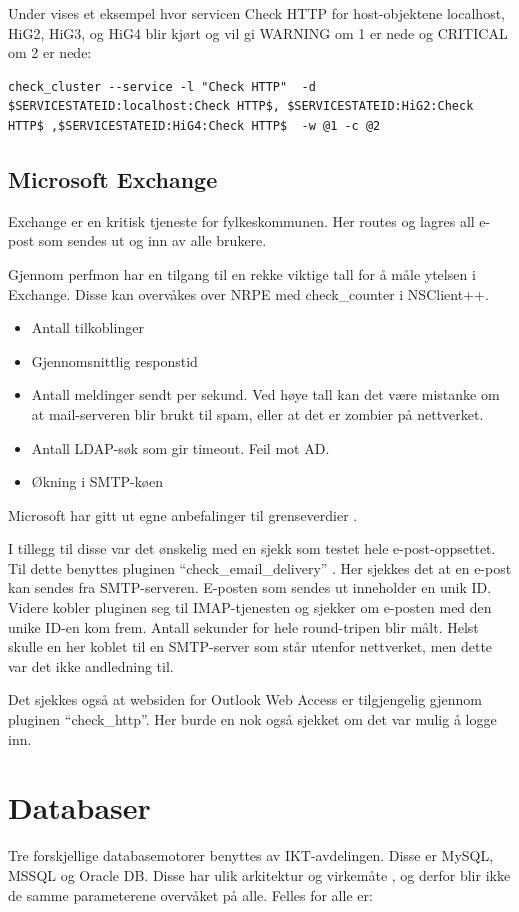 Under vises et eksempel hvor servicen Check HTTP for host-objektene localhost, HiG2, HiG3, og HiG4 blir kjørt og vil gi WARNING om 1 er nede og CRITICAL om 2 er nede: 
\begin{lstlisting}
check_cluster --service -l "Check HTTP"  -d $SERVICESTATEID:localhost:Check HTTP$, $SERVICESTATEID:HiG2:Check HTTP$ ,$SERVICESTATEID:HiG4:Check HTTP$  -w @1 -c @2
\end{lstlisting}

\subsection{Microsoft Exchange}

Exchange er en kritisk tjeneste for fylkeskommunen. Her routes og lagres all e-post som sendes ut og inn av alle brukere. 

Gjennom perfmon har en tilgang til en rekke viktige tall \cite{exchange} for å måle ytelsen i Exchange. Disse kan overvåkes over NRPE med check\_counter i NSClient++.
\begin{itemize}
	\item Antall tilkoblinger
	\item Gjennomsnittlig responstid
	\item Antall meldinger sendt per sekund. Ved høye tall kan det være mistanke om at mail-serveren blir brukt til spam, eller at det er zombier på nettverket.
	\item Antall LDAP-søk som gir timeout. Feil mot AD.
	\item Økning i SMTP-køen
\end{itemize}

Microsoft har gitt ut egne anbefalinger til grenseverdier \cite{exchangethresholds}.

I tillegg til disse var det ønskelig med en sjekk som testet hele e-post-oppsettet. Til dette benyttes pluginen “check\_email\_delivery” \cite{exchange}. Her sjekkes det at en e-post kan sendes fra SMTP-serveren. E-posten som sendes ut inneholder en unik ID. Videre kobler pluginen seg til IMAP-tjenesten og sjekker om e-posten med den unike ID-en kom frem. Antall sekunder for hele round-tripen blir målt. Helst skulle en her koblet til en SMTP-server som står utenfor nettverket, men dette var det ikke andledning til.

Det sjekkes også at websiden for Outlook Web Access er tilgjengelig gjennom pluginen “check\_http”. Her burde en nok også sjekket om det var mulig å logge inn.

\section{Databaser}
Tre forskjellige databasemotorer benyttes av IKT-avdelingen. Disse er MySQL, MSSQL og Oracle DB. Disse har ulik arkitektur og virkemåte \cite{databasecomparison}, og derfor blir ikke de samme parameterene overvåket på alle. Felles for alle er:

